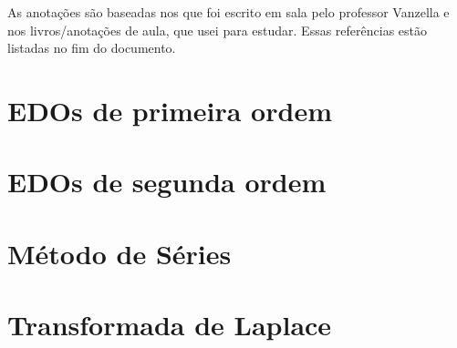 \documentclass[letterpaper, 12pt]{book}
\begin{document}
As anotações são baseadas nos que foi escrito em sala pelo professor Vanzella e nos livros/anotações
de aula, que usei para estudar. Essas referências estão listadas no fim do documento.

%

%

\chapter{EDOs de primeira ordem}


\chapter{EDOs de segunda ordem}



\chapter{Método de Séries}

\chapter{Transformada de Laplace}


\end{document}
